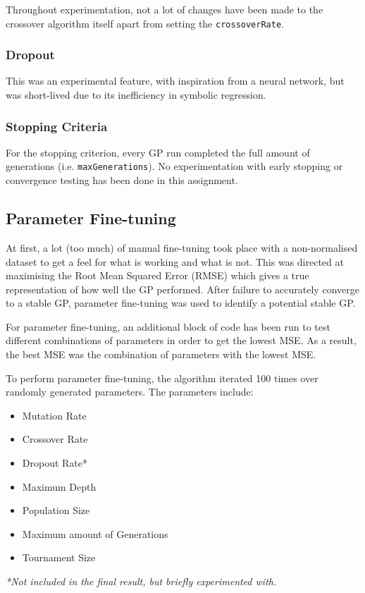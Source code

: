 \documentclass{article}
\begin{document}
Throughout experimentation, not a lot of changes have been made to the crossover algorithm itself apart from setting the \texttt{crossoverRate}.

\subsubsection{Dropout}
This was an experimental feature, with inspiration from a neural network, but was short-lived due to its inefficiency in symbolic regression.

\subsubsection{Stopping Criteria}
For the stopping criterion, every GP run completed the full amount of generations (i.e. \texttt{maxGenerations}). No experimentation with early stopping or convergence testing has been done in this assignment.

\subsection{Parameter Fine-tuning}
At first, a lot (too much) of manual fine-tuning took place with a non-normalised dataset to get a feel for what is working and what is not. This was directed at maximising the Root Mean Squared Error (RMSE) which gives a true representation of how well the GP performed. After failure to accurately converge to a stable GP, parameter fine-tuning was used to identify a potential stable GP.

For parameter fine-tuning, an additional block of code has been run to test different combinations of parameters in order to get the lowest MSE. As a result, the best MSE was the combination of parameters with the lowest MSE.

To perform parameter fine-tuning, the algorithm iterated 100 times over randomly generated parameters. The parameters include:
\begin{itemize}
  \item Mutation Rate
  \item Crossover Rate
  \item Dropout Rate*
  \item Maximum Depth
  \item Population Size
  \item Maximum amount of Generations
  \item Tournament Size
\end{itemize}
\emph{*Not included in the final result, but briefly experimented with.}
\end{document}
